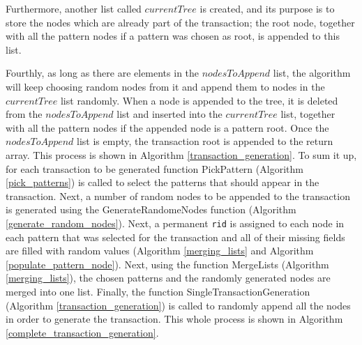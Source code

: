 \documentclass{acm_proc_article-sp-sigmod09}
\begin{document}
Furthermore, another list called $currentTree$ is created, and its purpose is to store the nodes which are already part of the transaction; the root node, together with all the pattern nodes if a pattern was chosen as root, is appended to this list.

Fourthly, as long as there are elements in the $nodesToAppend$ list, the algorithm will keep choosing random nodes from it and append them to nodes in the $currentTree$ list randomly. When a node is appended to the tree, it is deleted from the $nodesToAppend$ list and inserted into the $currentTree$ list, together with all the pattern nodes if the appended node is a pattern root. Once the $nodesToAppend$ list is empty, the transaction root is appended to the return array. This process is shown in Algorithm \ref{transaction_generation}. To sum it up, for each transaction to be generated function PickPattern (Algorithm \ref{pick_patterns}) is called to select the patterns that should appear in the transaction. Next, a number of random nodes to be appended to the transaction is generated using the GenerateRandomeNodes function (Algorithm \ref{generate_random_nodes}). Next, a permanent \texttt{rid} is assigned to each node in each pattern that was selected for the transaction and all of their missing fields are filled with random values (Algorithm \ref{merging_lists} and Algorithm \ref{populate_pattern_node}). Next, using the function MergeLists (Algorithm \ref{merging_lists}), the chosen patterns and the randomly generated nodes are merged into one list. Finally, the function SingleTransactionGeneration (Algorithm \ref{transaction_generation}) is called to randomly append all the nodes in order to generate the transaction. This whole process is shown in Algorithm \ref{complete_transaction_generation}.
\end{document}
